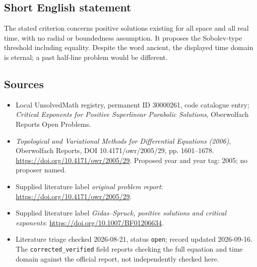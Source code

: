 \documentclass[11pt]{article}
\begin{document}
\subsection{Short English statement}
The stated criterion concerns positive solutions existing for all space and all real time, with no radial or boundedness assumption. It proposes the Sobolev-type threshold including equality. Despite the word ancient, the displayed time domain is eternal; a past half-line problem would be different.
\subsection{Sources}
\begin{itemize}\item Local UnsolvedMath registry, permanent ID 30000261, code catalogue entry; \emph{Critical Exponents for Positive Superlinear Parabolic Solutions}, Oberwolfach Reports Open Problems.\item \emph{Topological and Variational Methods for Differential Equations (2006)}, Oberwolfach Reports, DOI 10.4171/owr/2005/29, pp. 1601--1678. \url{https://doi.org/10.4171/owr/2005/29}. Proposed year and year tag: 2005; no proposer named.\item Supplied literature label \emph{original problem report}: \url{https://doi.org/10.4171/owr/2005/29}.\item Supplied literature label \emph{Gidas--Spruck, positive solutions and critical exponents}: \url{https://doi.org/10.1007/BF01206634}.\item Literature triage checked 2026-08-21, status \texttt{open}; record updated 2026-09-16. The \texttt{corrected\_verified} field reports checking the full equation and time domain against the official report, not independently checked here.\end{itemize}
\end{document}
